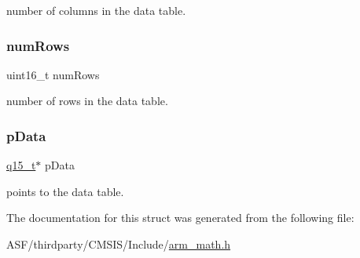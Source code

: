 number of columns in the data table. \mbox{\label{structarm__bilinear__interp__instance__q15_a1bcf80ccdc2acc29198f1592ae300390}} 
\subsubsection{\texorpdfstring{numRows}{numRows}}
{\footnotesize\ttfamily uint16\+\_\+t num\+Rows}

number of rows in the data table. \mbox{\label{structarm__bilinear__interp__instance__q15_a817ede38365e63e561a12069c6c5c087}} 
\subsubsection{\texorpdfstring{pData}{pData}}
{\footnotesize\ttfamily \mbox{\hyperlink{arm__math_8h_ab5a8fb21a5b3b983d5f54f31614052ea}{q15\+\_\+t}}$\ast$ p\+Data}

points to the data table. 

The documentation for this struct was generated from the following file\+:\begin{DoxyCompactItemize}
\item 
A\+S\+F/thirdparty/\+C\+M\+S\+I\+S/\+Include/\mbox{\hyperlink{arm__math_8h}{arm\+\_\+math.\+h}}\end{DoxyCompactItemize}
